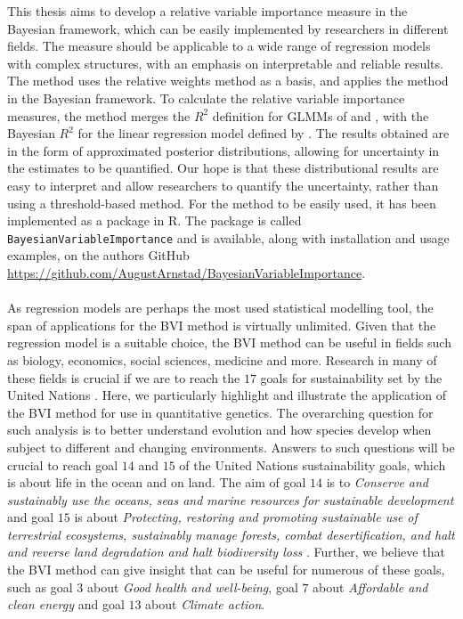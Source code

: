 This thesis aims to develop a relative variable importance measure in the Bayesian framework, which can be easily implemented by researchers in different fields. The measure should be applicable to a wide range of regression models with complex structures, with an emphasis on interpretable and reliable results. The method uses the relative weights method as a basis, and applies the method in the Bayesian framework. To calculate the relative variable importance measures, the method merges the $R^2$ definition for GLMMs of \citep{nakagawa2013general} and \citep{nakagawa2017}, with the Bayesian $R^2$ for the linear regression model defined by \citet{gelman2017rsquared}. The results obtained are in the form of approximated posterior distributions, allowing for uncertainty in the estimates to be quantified. Our hope is that these distributional results are easy to interpret and allow researchers to quantify the uncertainty, rather than using a threshold-based method. For the method to be easily used, it has been implemented as a package in R. The package is called \texttt{BayesianVariableImportance} and is available, along with installation and usage examples, on the authors GitHub \url{https://github.com/AugustArnstad/BayesianVariableImportance}. 
\\
\\
As regression models are perhaps the most used statistical modelling tool, the span of applications for the BVI method is virtually unlimited. Given that the regression model is a suitable choice, the BVI method can be useful in fields such as biology, economics, social sciences, medicine and more. Research in many of these fields is crucial if we are to reach the $17$ goals for sustainability set by the United Nations \citep{un_sdg_goals}. Here, we particularly highlight and illustrate the application of the BVI method for use in quantitative genetics. The overarching question for such analysis is to better understand evolution and how species develop when subject to different and changing environments. Answers to such questions will be crucial to reach goal $14$ and $15$ of the United Nations sustainability goals, which is about life in the ocean and on land. The aim of goal $14$ is to \textit{Conserve and sustainably use the oceans, seas and marine resources for sustainable development} and goal $15$ is about \textit{Protecting, restoring and promoting sustainable use of terrestrial ecosystems, sustainably manage forests, combat desertification, and halt and reverse land degradation and halt biodiversity loss} \citep{un_sdg_goals}. Further, we believe that the BVI method can give insight that can be useful for numerous of these goals, such as goal $3$ about \textit{Good health and well-being}, goal $7$ about \textit{Affordable and clean energy} and goal $13$ about \textit{Climate action}.
